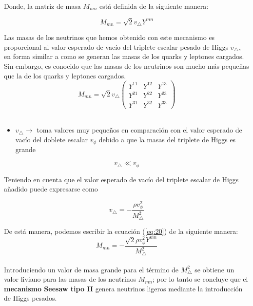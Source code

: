 \documentclass[12pt]{article}
\begin{document}
Donde, la matriz de masa \(M_{mn} \) está definida de la siguiente manera: 

\[M_{mn} = \sqrt{2}v_\triangle Y^{mn}\] 

Las masas de los neutrinos que hemos obtenido con este mecanismo
es proporcional al valor esperado de vacío del triplete escalar pesado de Higgs  $v_\triangle  $, en forma similar a como se generan
las masas de los quarks y leptones cargados. Sin embargo, es conocido
que las masas de los neutrinos son mucho más pequeñas que la de los
quarks y leptones cargados. \\

\begin{equation}
    M_{mn} = \sqrt{2}v_\triangle \begin{pmatrix}    Y^{11} &  Y^{12} & Y^{13} \\
         Y^{21} &  Y^{22} & Y^{23}  \\
         Y^{31} &  Y^{32} & Y^{33}  \end{pmatrix}
       \label{eq:20}  
\end{equation} \\

\begin{itemize}
    \item \(v_\triangle \rightarrow  \) toma valores muy pequeños
en comparación con el valor esperado de vacío del doblete escalar $v_\phi$ debido a que la masas del triplete de Higgs es grande
\end{itemize}
\[v_\triangle \ll v_\phi \]
  
Teniendo en cuenta que el valor esperado de vacío del triplete escalar de Higgs añadido puede expresarse como

\begin{equation}
    \label{eq:valoeradodevacío}
     v_\triangle = - \frac{\rho v^{2}_\phi}{M^{2}_\triangle}
\end{equation}

De está manera, podemos escribir la ecuación (\ref{eq:20}) de la siguiente manera: \\

\begin{equation}
    M_{mn}= -\frac{\sqrt{2}\rho v^{2}_\phi Y^{mn}}{M^{2}_\triangle} 
\end{equation} \\

Introduciendo un valor de masa grande para el término de \( M^{2}_\triangle \) se obtiene un valor liviano para las masas de los neutrinos \( M_{mn} \); por lo tanto se concluye que el \textbf{mecanismo Seesaw tipo II} genera neutrinos ligeros mediante la introducción de Higgs pesados. \\
\end{document}
